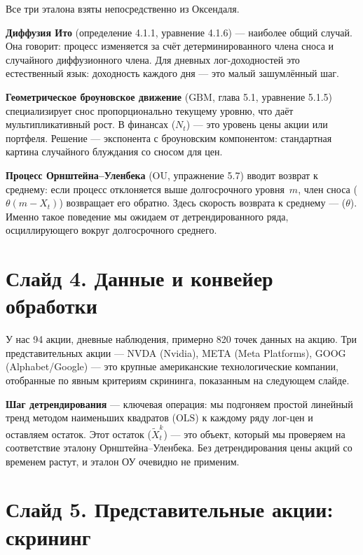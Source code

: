 \documentclass[12pt,a4paper]{article}
\begin{document}
Все три эталона взяты непосредственно из Оксендаля.

\textbf{Диффузия Ито} (определение 4.1.1, уравнение 4.1.6) --- наиболее общий случай.
Она говорит: процесс изменяется за счёт детерминированного члена сноса
и случайного диффузионного члена.
Для дневных лог-доходностей это естественный язык:
доходность каждого дня --- это малый зашумлённый шаг.

\textbf{Геометрическое броуновское движение}
($\text{GBM}$, глава 5.1, уравнение 5.1.5)
специализирует снос пропорционально текущему уровню,
что даёт мультипликативный рост.
В финансах ($N_t$) --- это уровень цены акции или портфеля.
Решение --- экспонента с броуновским компонентом:
стандартная картина случайного блуждания со сносом для цен.

\textbf{Процесс Орнштейна--Уленбека}
($\text{OU}$, упражнение 5.7)
вводит возврат к среднему:
если процесс отклоняется выше долгосрочного уровня~$m$,
член сноса ($\theta(m - X_t)$) возвращает его обратно.
Здесь скорость возврата к среднему --- ($\theta$).
Именно такое поведение мы ожидаем от детрендированного ряда,
осциллирующего вокруг долгосрочного среднего.

\section{Слайд 4. Данные и конвейер обработки}

У нас 94 акции, дневные наблюдения,
примерно 820 точек данных на акцию.
Три представительных акции ---
NVDA (Nvidia), META (Meta Platforms), GOOG (Alphabet/Google) ---
это крупные американские технологические компании,
отобранные по явным критериям скрининга, показанным на следующем слайде.

\textbf{Шаг детрендирования} --- ключевая операция:
мы подгоняем простой линейный тренд методом наименьших квадратов ($\text{OLS}$)
к каждому ряду лог-цен и оставляем остаток.
Этот остаток ($\widetilde{X}_t^k$) ---
это объект, который мы проверяем на соответствие эталону Орнштейна--Уленбека.
Без детрендирования цены акций со временем растут,
и эталон ОУ очевидно не применим.

\section{Слайд 5. Представительные акции: скрининг}
\end{document}
